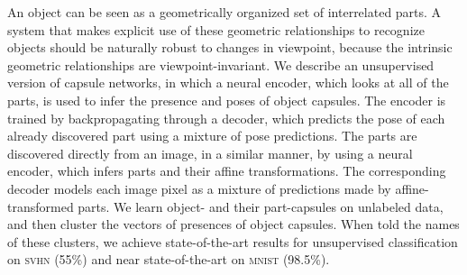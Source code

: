 An object can be seen as a geometrically organized set of interrelated parts.
A system that makes explicit use of these geometric relationships to recognize objects should be naturally robust to changes in viewpoint, because the intrinsic geometric relationships are viewpoint-invariant.
We describe an unsupervised version of capsule networks, in which a neural encoder, which looks at all of the parts, is used to infer the presence and poses of object capsules.
The encoder is trained by backpropagating through a decoder, which predicts the pose of each already discovered part using a mixture of pose predictions.
The parts are discovered directly from an image, in a similar manner, by using a neural encoder, which infers parts and their affine transformations.
The corresponding decoder models each image pixel as a mixture of predictions made by affine-transformed parts.
We learn object- and their part-capsules on unlabeled data, and then cluster the vectors of presences of object capsules.
When told the names of these clusters, we achieve state-of-the-art results for unsupervised classification on \textsc{svhn} (55\%) and near state-of-the-art on \textsc{mnist} (98.5\%).

